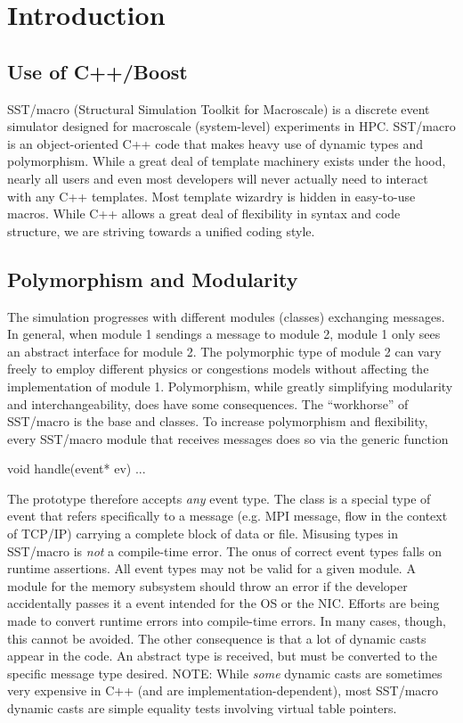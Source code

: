 
\chapter{Introduction}\label{chapter:intro}

\section{Use of C++/Boost}\label{sec:boost}
SST/macro (Structural Simulation Toolkit for Macroscale) is a discrete event simulator designed for macroscale (system-level) experiments in HPC. 
SST/macro is an object-oriented C++ code that makes heavy use of dynamic types and polymorphism.
While a great deal of template machinery exists under the hood, nearly all users and even most developers will never actually need to interact with any C++ templates.
Most template wizardry is hidden in easy-to-use macros.
While C++ allows a great deal of flexibility in syntax and code structure, we are striving towards a unified coding style.

\section{Polymorphism and Modularity}\label{sec:polymorphism}
The simulation progresses with different modules (classes) exchanging messages.
In general, when module 1 sendings a message to module 2, module 1 only sees an abstract interface for module 2.
The polymorphic type of module 2 can vary freely to employ different physics or congestions models without affecting the implementation of module 1. 
Polymorphism, while greatly simplifying modularity and interchangeability, does have some consequences.
The ``workhorse'' of SST/macro is the base  and  classes.
To increase polymorphism and flexibility, every SST/macro module that receives messages does so via the generic function

\begin{CppCode}
void
handle(event* ev){
...
}
\end{CppCode}
The prototype therefore accepts \emph{any} event type. The class  is a special type of event that refers specifically to a message (e.g. MPI message, flow in the context of TCP/IP) carrying a complete block of data or file.
Misusing types in SST/macro is \emph{not} a compile-time error.
The onus of correct event types falls on runtime assertions.
All event types may not be valid for a given module.
A module for the memory subsystem should throw an error if the developer accidentally passes it a event intended for the OS or the NIC.
Efforts are being made to convert runtime errors into compile-time errors.
In many cases, though, this cannot be avoided.
The other consequence is that a lot of dynamic casts appear in the code.
An abstract  type is received, but must be converted to the specific message type desired.
NOTE: While \emph{some} dynamic casts are sometimes very expensive in C++ (and are implementation-dependent),
most SST/macro dynamic casts are simple equality tests involving virtual table pointers.

